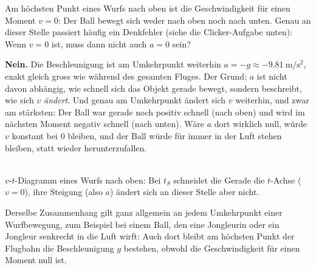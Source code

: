 \documentclass[addpoints,11pt,a4paper]{exam}
\begin{document}
\begin{theoriebox}
Am höchsten Punkt eines Wurfs nach oben ist die Geschwindigkeit für einen
Moment $v=0$: Der Ball bewegt sich weder nach oben noch nach unten. Genau
an dieser Stelle passiert häufig ein Denkfehler (siehe die
Clicker-Aufgabe unten): Wenn $v=0$ ist, muss dann nicht auch $a=0$ sein?

\textbf{Nein.} Die Beschleunigung ist am Umkehrpunkt weiterhin
$a=-g\approx-\SI{9.81}{\meter\per\second\squared}$, exakt gleich gross
wie während des gesamten Fluges. Der Grund: $a$ ist nicht davon
abhängig, wie schnell sich das Objekt gerade bewegt, sondern beschreibt,
wie sich $v$ \emph{ändert}. Und genau am Umkehrpunkt ändert sich $v$
weiterhin, und zwar am stärksten: Der Ball war gerade noch positiv
schnell (nach oben) und wird im nächsten Moment negativ schnell (nach
unten). Wäre $a$ dort wirklich null, würde $v$ konstant bei $0$ bleiben,
und der Ball würde für immer in der Luft stehen bleiben, statt wieder
herunterzufallen.

\begin{center}
\\[0.2em]
{\scriptsize $v$-$t$-Diagramm eines Wurfs nach oben: Bei $t_S$ schneidet
die Gerade die $t$-Achse ($v=0$), ihre Steigung (also $a$) ändert sich an
dieser Stelle aber nicht.}
\end{center}

Derselbe Zusammenhang gilt ganz allgemein an jedem Umkehrpunkt einer
Wurfbewegung, zum Beispiel bei einem Ball, den eine Jongleurin oder ein
Jongleur senkrecht in die Luft wirft: Auch dort bleibt am höchsten Punkt
der Flugbahn die Beschleunigung $g$ bestehen, obwohl die Geschwindigkeit
für einen Moment null ist.
\end{theoriebox}
\end{document}
